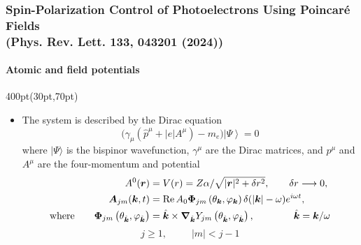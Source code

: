 \begin{frame}
\frametitle{Spin-Polarization Control of Photoelectrons
Using Poincar\'e Fields \\
\small (Phys. Rev. Lett. \textbf{133}, 043201 (2024))}
\framesubtitle{Atomic and field potentials}


\footnotesize
\begin{textblock*}{400pt}(30pt,70pt)
\begin{itemize}
\item The system is described by the Dirac equation
\begin{equation}
\Bigg( \gamma_\mu \left( \hat{p}^{\mu} + \left| e \right|A^{\mu}\right)
 - m_e\Bigg)\left|\Psi\right\rangle = 0 \label{eqn:dirac}
\end{equation}
where $|\Psi\rangle$ is the bispinor wavefunction, 
$\gamma^{\mu}$ are the Dirac matrices, and
$p^{\mu}$ and $A^{\mu}$ are the four-momentum and potential
\begin{align}
A^0(\boldsymbol{r}) & = V(r) = Z\alpha/\sqrt{|\boldsymbol{r}|^2+\delta r^2},
\hspace{20pt} \delta r \longrightarrow 0, \\
\boldsymbol{A}_{jm}(\boldsymbol{k},t) & = 
{\rm Re}\,A_0{\boldsymbol{\Phi}}_{jm}
\left( \theta_{\boldsymbol{k}},\varphi_{\boldsymbol{k}}\right)
\delta(|\boldsymbol{k}|-\omega)e^{i\omega t}, \\
{\rm where}\hspace{20pt} 
{\boldsymbol{\Phi}}_{jm}
\left( \theta_{\hat{\boldsymbol{k}}},\varphi_{\hat{\boldsymbol{k}}}\right) & =
\hat{\boldsymbol{k}}\times \boldsymbol{\nabla}_{\hat{\boldsymbol{k}}} Y_{jm}
\left( \theta_{\hat{\boldsymbol{k}}},\varphi_{\hat{\boldsymbol{k}}}\right), 
\hspace{40pt} \hat{\boldsymbol{k}} = {\boldsymbol{k}}/\omega
\end{align}
\vspace{20pt}
\begin{equation}
j\geqslant 1, \hspace{30pt} |m| < j-1
\end{equation}
\end{itemize}
\end{textblock*}
 
\end{frame}


